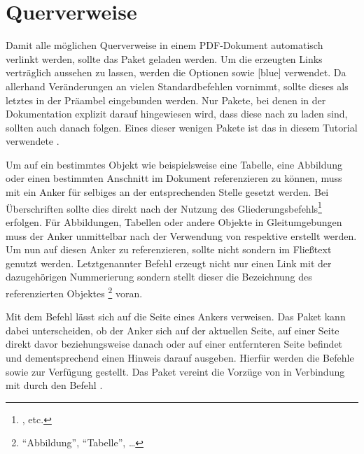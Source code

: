 \documentclass[%
  english,ngerman,%
  cdgeometry=no,DIV=12,automark,%
]{tudscrartcl}
\begin{document}
\section{Querverweise}
\label{sec:references}
%
Damit alle möglichen Querverweise in einem PDF-Dokument automatisch verlinkt 
werden, sollte das Paket  geladen werden. Um die erzeugten 
Links verträglich aussehen zu lassen, werden die Optionen  
sowie [blue] verwendet. Da  allerhand 
Veränderungen an vielen Standardbefehlen vornimmt, sollte dieses als letztes in 
der Präambel eingebunden werden. Nur Pakete, bei denen in der Dokumentation 
explizit darauf hingewiesen wird, dass diese nach  zu laden 
sind, sollten auch danach folgen. Eines dieser wenigen Pakete ist das in diesem 
Tutorial verwendete . 
%
\begin{Hint}
\usepackage[colorlinks,linkcolor=blue]{hyperref}

\end{Hint}
%
Um auf ein bestimmtes Objekt wie beispielsweise eine Tabelle, eine Abbildung 
oder einen bestimmten Anschnitt im Dokument referenzieren zu können, muss mit 
 ein Anker für selbiges an der entsprechenden 
Stelle gesetzt werden. Bei Überschriften sollte dies direkt nach der Nutzung 
des Gliederungsbefehls\footnote{,  etc.} 
erfolgen. Für Abbildungen, Tabellen oder andere Objekte in Gleitumgebungen muss 
der Anker unmittelbar nach der Verwendung von  respektive 
 erstellt werden. Um nun auf diesen Anker zu referenzieren, 
sollte nicht  sondern  im Fließtext genutzt werden. 
Letztgenannter Befehl erzeugt nicht nur einen Link mit der dazugehörigen 
Nummerierung sondern stellt dieser die Bezeichnung des referenzierten Objektes%
\footnote{\enquote{Abbildung}, \enquote{Tabelle}, \dots} voran. 

Mit dem Befehl  lässt sich auf die Seite eines Ankers verweisen. 
Das Paket  kann dabei unterscheiden, ob der Anker sich auf 
der aktuellen Seite, auf einer Seite direkt davor beziehungsweise danach oder 
auf einer entfernteren Seite befindet und dementsprechend einen Hinweis darauf 
ausgeben. Hierfür werden die Befehle  sowie  zur 
Verfügung gestellt. Das Paket  vereint die Vorzüge von 
 in Verbindung mit  durch den Befehl .
\end{document}
